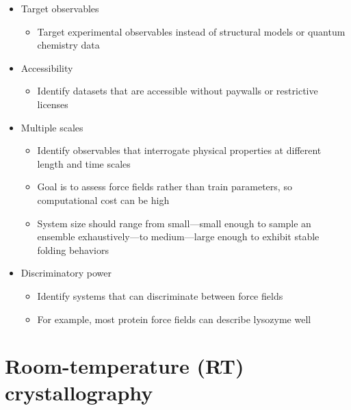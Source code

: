 \documentclass[9pt,review]{livecoms}
\begin{document}
\begin{itemize}

\item Target observables

	\begin{itemize}
	\item Target experimental observables instead of structural models or quantum chemistry data
	\end{itemize}

\item Accessibility

	\begin{itemize}
	\item Identify datasets that are accessible without paywalls or restrictive licenses
	\end{itemize}

\item Multiple scales

	\begin{itemize}
	\item Identify observables that interrogate physical properties at different length and time scales
	\item Goal is to assess force fields rather than train parameters, so computational cost can be high
	\item System size should range from small---small enough to sample an ensemble exhaustively---to medium---large enough to exhibit stable folding behaviors
	\end{itemize}

\item Discriminatory power

	\begin{itemize}
	\item Identify systems that can discriminate between force fields
	\item For example, most protein force fields can describe lysozyme well
	\end{itemize}

\end{itemize}

\section{Room-temperature (RT) crystallography}
\end{document}
